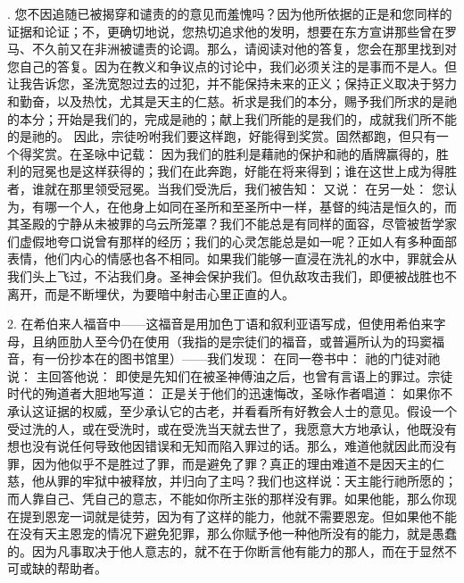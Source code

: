 . 您不因追随已被揭穿和谴责的的意见而羞愧吗？因为他所依据的正是和您同样的证据和论证；不，更确切地说，您热切追求他的发明，想要在东方宣讲那些曾在罗马、不久前又在非洲被谴责的论调。那么，请阅读对他的答复，您会在那里找到对您自己的答复。因为在教义和争议点的讨论中，我们必须关注的是事而不是人。但让我告诉您，圣洗宽恕过去的过犯，并不能保持未来的正义；保持正义取决于努力和勤奋，以及热忱，尤其是天主的仁慈。祈求是我们的本分，赐予我们所求的是祂的本分；开始是我们的，完成是祂的；献上我们所能的是我们的，成就我们所不能的是祂的。 因此，宗徒吩咐我们要这样跑，好能得到奖赏。固然都跑，但只有一个得奖赏。在圣咏中记载： 因为我们的胜利是藉祂的保护和祂的盾牌赢得的，胜利的冠冕也是这样获得的；我们在此奔跑，好能在将来得到；谁在这世上成为得胜者，谁就在那里领受冠冕。当我们受洗后，我们被告知： 又说： 在另一处： 您认为，有哪一个人，在他身上如同在圣所和至圣所中一样，基督的纯洁是恒久的，而其圣殿的宁静从未被罪的乌云所笼罩？我们不能总是有同样的面容，尽管被哲学家们虚假地夸口说曾有那样的经历；我们的心灵怎能总是如一呢？正如人有多种面部表情，他们内心的情感也各不相同。如果我们能够一直浸在洗礼的水中，罪就会从我们头上飞过，不沾我们身。圣神会保护我们。但仇敌攻击我们，即便被战胜也不离开，而是不断埋伏，为要暗中射击心里正直的人。\par

2. 在希伯来人福音中——这福音是用加色丁语和叙利亚语写成，但使用希伯来字母，且纳匝肋人至今仍在使用（我指的是宗徒们的福音，或普遍所认为的玛窦福音，有一份抄本在的图书馆里）——我们发现： 在同一卷书中： 祂的门徒对祂说： 主回答他说： 即使是先知们在被圣神傅油之后，也曾有言语上的罪过。宗徒时代的殉道者大胆地写道： 正是关于他们的迅速悔改，圣咏作者唱道： 如果你不承认这证据的权威，至少承认它的古老，并看看所有好教会人士的意见。假设一个受过洗的人，或在受洗时，或在受洗当天就去世了，我愿意大方地承认，他既没有想也没有说任何导致他因错误和无知而陷入罪过的话。那么，难道他就因此而没有罪，因为他似乎不是胜过了罪，而是避免了罪？真正的理由难道不是因天主的仁慈，他从罪的牢狱中被释放，并归向了主吗？我们也这样说：天主能行祂所愿的；而人靠自己、凭自己的意志，不能如你所主张的那样没有罪。如果他能，那么你现在提到恩宠一词就是徒劳，因为有了这样的能力，他就不需要恩宠。但如果他不能在没有天主恩宠的情况下避免犯罪，那么你赋予他一种他所没有的能力，就是愚蠢的。因为凡事取决于他人意志的，就不在于你断言他有能力的那人，而在于显然不可或缺的帮助者。\par

